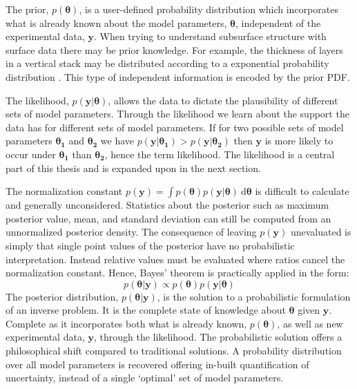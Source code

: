 The prior, $p(\bm{\theta})$, is a user-defined probability distribution which incorporates what is already known about the model parameters, $\bm{\theta}$, independent of the experimental data, $\bm{y}$. When trying to understand subsurface structure with surface data there may be prior knowledge. For example, the thickness of layers in a vertical stack may be distributed according to a exponential probability distribution \citep{Mosegaard1995}. This type of independent information is encoded by the prior PDF.\par

The likelihood, $p(\bm{y}|\bm{\theta})$, allows the data to dictate the plausibility of different sets of model parameters. Through the likelihood we learn about the support the data has for different sets of model parameters. If for two possible sets of model parameters $\bm{\theta_1}$ and $\bm{\theta_2}$ we have $p(\bm{y}|\bm{\theta_1}) > p(\bm{y}|\bm{\theta_2})$ then $\bm{y}$ is more likely to occur under $\bm{\theta_1}$ than $\bm{\theta_2}$, hence the term likelihood. The likelihood is a central part of this thesis and is expanded upon in the next section.\par

The normalization constant $p(\bm{y}) = \int p(\bm{\theta}) p(\bm{y}|\bm{\theta})\ \text{d}\bm{\theta}$ is difficult to calculate and generally unconsidered. Statistics about the posterior such as maximum posterior value, mean, and standard deviation can still be computed from an unnormalized posterior density. The consequence of leaving $p(\bm{y})$ unevaluated is simply that single point values of the posterior have no probabilistic interpretation. Instead relative values must be evaluated where ratios cancel the normalization constant. Hence, Bayes' theorem is practically applied in the form:
\begin{equation}
p(\bm{\theta}|\bm{y}) \propto p(\bm{\theta}) p(\bm{y}|\bm{\theta})
\label{applied_bayes}	
\end{equation}
The posterior distribution, $p(\bm{\theta}|\bm{y})$, is the solution to a probabilistic formulation of an inverse problem. It is the complete state of knowledge about $\bm{\theta}$ given $\bm{y}$. Complete as it incorporates both what is already known, $p(\bm{\theta})$, as well as new experimental data, $\bm{y}$, through the likelihood. The probabilistic solution offers a philosophical shift compared to traditional solutions. A probability distribution over all model parameters is recovered offering in-built quantification of uncertainty, instead of a single `optimal' set of model parameters. \par

